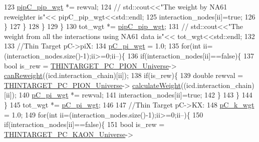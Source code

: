 \begin{DoxyCode}
123           \hyperlink{class_neutrino_flux_reweight_1_1_reweight_driver_a61de96d5fb96639323a271dcf0677be0}{pipC\_pip\_wgt} *= rewval;
124   \textcolor{comment}{// std::cout<<"The weight by NA61 reweighter is"<< pipC\_pip\_wgt<<std::endl;}
125           interaction\_nodes[ii]=\textcolor{keyword}{true};
126         \}
127       \}
128     \}
129 \}
130    tot\_wgt *= \hyperlink{class_neutrino_flux_reweight_1_1_reweight_driver_a61de96d5fb96639323a271dcf0677be0}{pipC\_pip\_wgt};
131  \textcolor{comment}{//  std::cout<<"The weight from all the interactions using NA61 data is"<< tot\_wgt<<std::endl; }
132    
133  \textcolor{comment}{//Thin Target pC->piX:}
134     \hyperlink{class_neutrino_flux_reweight_1_1_reweight_driver_a488fa95dec3079d30e56973fd4de3783}{pC\_pi\_wgt} = 1.0;
135     \textcolor{keywordflow}{for}(\textcolor{keywordtype}{int} ii=(interaction\_nodes.size()-1);ii>=0;ii--)\{        
136       \textcolor{keywordflow}{if}(interaction\_nodes[ii]==\textcolor{keyword}{false})\{
137         \textcolor{keywordtype}{bool} is\_rew = \hyperlink{class_neutrino_flux_reweight_1_1_reweight_driver_aceea3b1dd8305e7d37c0b661840d52a7}{THINTARGET\_PC\_PION\_Universe}->
      \hyperlink{class_neutrino_flux_reweight_1_1_thin_targetp_c_pion_reweighter_a09067dcacb294ca133e2660d61302e85}{canReweight}((icd.interaction\_chain)[ii]);
138         \textcolor{keywordflow}{if}(is\_rew)\{
139           \textcolor{keywordtype}{double} rewval = \hyperlink{class_neutrino_flux_reweight_1_1_reweight_driver_aceea3b1dd8305e7d37c0b661840d52a7}{THINTARGET\_PC\_PION\_Universe}->
      \hyperlink{class_neutrino_flux_reweight_1_1_thin_targetp_c_pion_reweighter_ab797bbeeedb04cda73feef891434cd5f}{calculateWeight}((icd.interaction\_chain)[ii]);
140           \hyperlink{class_neutrino_flux_reweight_1_1_reweight_driver_a488fa95dec3079d30e56973fd4de3783}{pC\_pi\_wgt} *= rewval;
141           interaction\_nodes[ii]=\textcolor{keyword}{true};
142         \}
143       \}
144     \}
145     tot\_wgt *= \hyperlink{class_neutrino_flux_reweight_1_1_reweight_driver_a488fa95dec3079d30e56973fd4de3783}{pC\_pi\_wgt};
146        
147     \textcolor{comment}{//Thin Target pC->KX:}
148     \hyperlink{class_neutrino_flux_reweight_1_1_reweight_driver_a082aaa736863e7bdfc8a057fcc78164c}{pC\_k\_wgt} = 1.0;    
149     \textcolor{keywordflow}{for}(\textcolor{keywordtype}{int} ii=(interaction\_nodes.size()-1);ii>=0;ii--)\{        
150       \textcolor{keywordflow}{if}(interaction\_nodes[ii]==\textcolor{keyword}{false})\{
151         \textcolor{keywordtype}{bool} is\_rew = \hyperlink{class_neutrino_flux_reweight_1_1_reweight_driver_aacd236a73fd4e708a0e90a1ca9edcb76}{THINTARGET\_PC\_KAON\_Universe}->

\end{DoxyCode}
